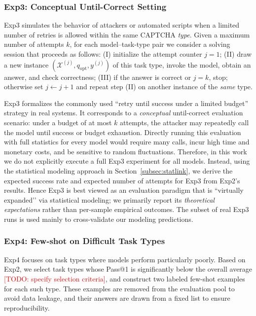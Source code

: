 \documentclass[sigconf, review]{acmart}
\begin{document}
\subsubsection{Exp3: Conceptual Until-Correct Setting}

Exp3 simulates the behavior of attackers or automated scripts when a limited number of retries is allowed within the same CAPTCHA \emph{type}. Given a maximum number of attempts $k$, for each model–task-type pair we consider a solving session that proceeds as follows: (I) initialize the attempt counter $j = 1$; (II) draw a new instance $(\mathcal{X}^{(j)}, q_{\text{opt}}, y^{(j)})$ of this task type, invoke the model, obtain an answer, and check correctness; (III) if the answer is correct or $j = k$, stop; otherwise set $j \leftarrow j+1$ and repeat step (II) on another instance of the \emph{same} type.

Exp3 formalizes the commonly used “retry until success under a limited budget” strategy in real systems. It corresponds to a \emph{conceptual} until-correct evaluation scenario: under a budget of at most $k$ attempts, the attacker may repeatedly call the model until success or budget exhaustion. Directly running this evaluation with full statistics for every model would require many calls, incur high time and monetary costs, and be sensitive to random fluctuations. Therefore, in this work we do not explicitly execute a full Exp3 experiment for all models. Instead, using the statistical modeling approach in Section~\ref{subsec:statlink}, we derive the expected success rate and expected number of attempts for Exp3 from Exp2’s results. Hence Exp3 is best viewed as an evaluation paradigm that is “virtually expanded’’ via statistical modeling; we primarily report its \emph{theoretical expectations} rather than per-sample empirical outcomes. The subset of real Exp3 runs is used mainly to cross-validate our modeling predictions.

\subsubsection{Exp4: Few-shot on Difficult Task Types}

Exp4 focuses on task types where models perform particularly poorly. Based on Exp2, we select task types whose Pass@1 is significantly below the overall average \textcolor{red}{[TODO: specify selection criteria]}, and construct two labeled few-shot examples for each such type. These examples are removed from the evaluation pool to avoid data leakage, and their answers are drawn from a fixed list to ensure reproducibility.
\end{document}
